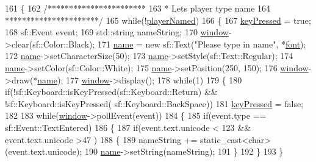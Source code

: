 \begin{DoxyCode}
161 \{
162     \textcolor{comment}{/***********************}
163 \textcolor{comment}{     * Lets player type name}
164 \textcolor{comment}{     **********************/}
165     \textcolor{keywordflow}{while}(!\hyperlink{classTestApp_a99c2afa2a2f7e902d2f17d43658d16b3}{playerNamed})
166     \{
167         \hyperlink{classTestApp_adbba8de35ec57db1dff011a828d82f10}{keyPressed} = \textcolor{keyword}{true};
168         sf::Event event;
169         std::string nameString;
170         \hyperlink{classTestApp_a0b6b080a777092db64519ef7c4309105}{window}->clear(sf::Color::Black);
171         \hyperlink{classTestApp_a2b66863e154bba70cd466f3a0ac757e2}{name} = \textcolor{keyword}{new} sf::Text(\textcolor{stringliteral}{"Please type in name"}, *\hyperlink{classTestApp_abdcc9c2825cc0e067f2d59015e27c310}{font});
172         \hyperlink{classTestApp_a2b66863e154bba70cd466f3a0ac757e2}{name}->setCharacterSize(50);
173         \hyperlink{classTestApp_a2b66863e154bba70cd466f3a0ac757e2}{name}->setStyle(sf::Text::Regular);
174         \hyperlink{classTestApp_a2b66863e154bba70cd466f3a0ac757e2}{name}->setColor(sf::Color::White);
175         \hyperlink{classTestApp_a2b66863e154bba70cd466f3a0ac757e2}{name}->setPosition(250, 150);
176         \hyperlink{classTestApp_a0b6b080a777092db64519ef7c4309105}{window}->draw(*\hyperlink{classTestApp_a2b66863e154bba70cd466f3a0ac757e2}{name});
177         \hyperlink{classTestApp_a0b6b080a777092db64519ef7c4309105}{window}->display();
178         \textcolor{keywordflow}{while}(1)
179         \{
180             \textcolor{keywordflow}{if}(!sf::Keyboard::isKeyPressed(sf::Keyboard::Return) && !sf::Keyboard::isKeyPressed(
      sf::Keyboard::BackSpace))
181                 \hyperlink{classTestApp_adbba8de35ec57db1dff011a828d82f10}{keyPressed} = \textcolor{keyword}{false};
182 
183             \textcolor{keywordflow}{while}(\hyperlink{classTestApp_a0b6b080a777092db64519ef7c4309105}{window}->pollEvent(event))
184             \{
185                 \textcolor{keywordflow}{if}(event.type == sf::Event::TextEntered)
186                 \{
187                     \textcolor{keywordflow}{if}(event.text.unicode < 123 && event.text.unicode >47 )
188                     \{
189                         nameString += \textcolor{keyword}{static\_cast<}\textcolor{keywordtype}{char}\textcolor{keyword}{>}(\textcolor{keyword}{event}.text.unicode);
190                         \hyperlink{classTestApp_a2b66863e154bba70cd466f3a0ac757e2}{name}->setString(nameString);
191                     \}
192                 \}
193             \}

\end{DoxyCode}
